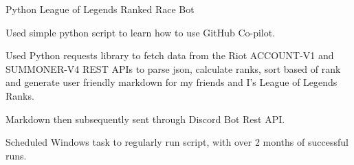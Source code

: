 

\begin{cventries}

  \cventry
    {Python} %
    {League of Legends Ranked Race Bot} %
    {} %
    {} %
    {
      \begin{cvitems} %
        \item{Used simple python script to learn how to use GitHub Co-pilot.}
        \item{Used Python requests library to fetch data from the Riot ACCOUNT-V1 and SUMMONER-V4 REST APIs to parse json, calculate ranks, sort based of rank and generate user friendly markdown for my friends and I's League of Legends Ranks.}
        \item{Markdown then subsequently sent through Discord Bot Rest API.}
        \item {Scheduled Windows task to regularly run script, with over 2 months of successful runs.}
      \end{cvitems}
    }


\end{cventries}
